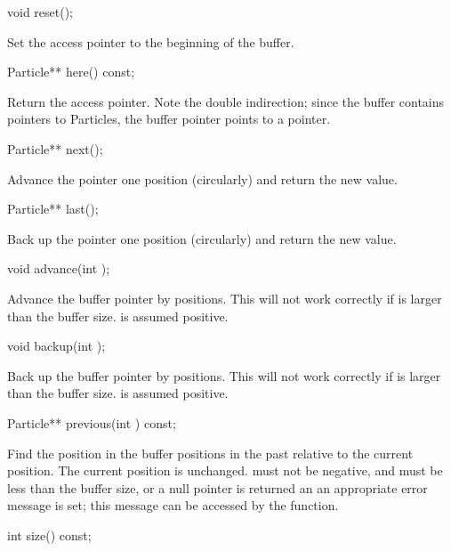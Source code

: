 \begin{example}
void reset();
\end{example}

Set the access pointer to the beginning of the buffer.

\begin{example}
Particle** here() const;
\end{example}

Return the access pointer.  Note the double indirection; since the
buffer contains pointers to Particles, the buffer pointer points
to a pointer.

\begin{example}
Particle** next();
\end{example}

Advance the pointer one position (circularly) and return the new value.

\begin{example}
Particle** last();
\end{example}

Back up the pointer one position (circularly) and return the new value.

\begin{example}
void advance(int );
\end{example}

Advance the buffer pointer by  positions.  This will not work correctly
if  is larger than the buffer size.   is assumed positive.

\begin{example}
void backup(int );
\end{example}

Back up the buffer pointer by  positions.  This will not work correctly
if  is larger than the buffer size.   is assumed positive.

\begin{example}
Particle** previous(int ) const;
\end{example}

Find the position in the buffer  positions in the past
relative to the current position.  The current position is unchanged.
 must not be negative, and must be less than the buffer
size, or a null pointer is returned an an appropriate error message
is set; this message can be accessed by the  function.

\begin{example}
int size() const;
\end{example}

